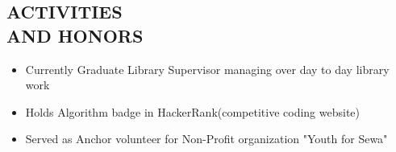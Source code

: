 \documentclass[margin]{res}
\begin{document}
\begin{resume}







\section{ACTIVITIES \\ AND HONORS}
\begin{itemize}[noitemsep,topsep=0pt]
\item Currently Graduate Library Supervisor managing over day to day library work
\item Holds Algorithm badge in HackerRank(competitive coding website)
\item Served as Anchor volunteer for Non-Profit organization "Youth for Sewa"


\end{itemize}


\end{resume}
\end{document}
